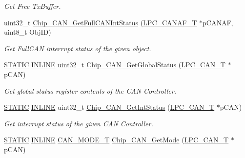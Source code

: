 \begin{DoxyCompactItemize}
\begin{DoxyCompactList}\small\item\em Get Free Tx\+Buffer. \end{DoxyCompactList}\item 
uint32\+\_\+t \hyperlink{group__CAN__17XX__40XX_gaf955e0441bf4ca24b8c72f59aabbd9e8}{Chip\+\_\+\+C\+A\+N\+\_\+\+Get\+Full\+C\+A\+N\+Int\+Status} (\hyperlink{structLPC__CANAF__T}{L\+P\+C\+\_\+\+C\+A\+N\+A\+F\+\_\+T} $\ast$p\+C\+A\+N\+AF, uint8\+\_\+t Obj\+ID)
\begin{DoxyCompactList}\small\item\em Get Full\+C\+AN interrupt status of the given object. \end{DoxyCompactList}\item 
\hyperlink{group__LPC__Types__Public__Macros_ga10b2d890d871e1489bb02b7e70d9bdfb}{S\+T\+A\+T\+IC} \hyperlink{group__LPC__Types__Public__Types_ga2eb6f9e0395b47b8d5e3eeae4fe0c116}{I\+N\+L\+I\+NE} uint32\+\_\+t \hyperlink{group__CAN__17XX__40XX_ga524163e227eb47b1ddae20b2abc6d588}{Chip\+\_\+\+C\+A\+N\+\_\+\+Get\+Global\+Status} (\hyperlink{structLPC__CAN__T}{L\+P\+C\+\_\+\+C\+A\+N\+\_\+T} $\ast$p\+C\+AN)
\begin{DoxyCompactList}\small\item\em Get global status register contents of the C\+AN Controller. \end{DoxyCompactList}\item 
\hyperlink{group__LPC__Types__Public__Macros_ga10b2d890d871e1489bb02b7e70d9bdfb}{S\+T\+A\+T\+IC} \hyperlink{group__LPC__Types__Public__Types_ga2eb6f9e0395b47b8d5e3eeae4fe0c116}{I\+N\+L\+I\+NE} uint32\+\_\+t \hyperlink{group__CAN__17XX__40XX_ga40be5e20a794a039df4465b164d50f74}{Chip\+\_\+\+C\+A\+N\+\_\+\+Get\+Int\+Status} (\hyperlink{structLPC__CAN__T}{L\+P\+C\+\_\+\+C\+A\+N\+\_\+T} $\ast$p\+C\+AN)
\begin{DoxyCompactList}\small\item\em Get interrupt status of the given C\+AN Controller. \end{DoxyCompactList}\item 
\hyperlink{group__LPC__Types__Public__Macros_ga10b2d890d871e1489bb02b7e70d9bdfb}{S\+T\+A\+T\+IC} \hyperlink{group__LPC__Types__Public__Types_ga2eb6f9e0395b47b8d5e3eeae4fe0c116}{I\+N\+L\+I\+NE} \hyperlink{group__CAN__17XX__40XX_ga57c03b9f9b4ebf86dccc13baf8c2889c}{C\+A\+N\+\_\+\+M\+O\+D\+E\+\_\+T} \hyperlink{group__CAN__17XX__40XX_gaee6c1afaca19ff9c9ad2ee1bab77a713}{Chip\+\_\+\+C\+A\+N\+\_\+\+Get\+Mode} (\hyperlink{structLPC__CAN__T}{L\+P\+C\+\_\+\+C\+A\+N\+\_\+T} $\ast$p\+C\+AN)

\end{DoxyCompactItemize}
